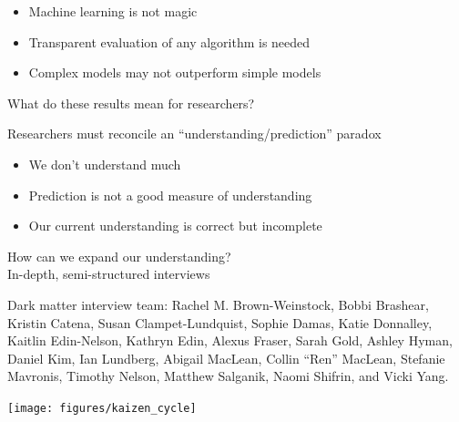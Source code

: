 \documentclass[aspectratio=169]{beamer}
\begin{document}
\begin{frame}

\begin{itemize}
\item Machine learning is not magic\pause
\item Transparent evaluation of any algorithm is needed \pause
\item Complex models may not outperform simple models
\end{itemize}

\end{frame}
\begin{frame}

\begin{center}
\Large{What do these results mean for researchers?}
\end{center}

\end{frame}
\begin{frame}

Researchers must reconcile an ``understanding/prediction'' paradox \pause
\begin{itemize}
\item We don't understand much \pause
\item Prediction is not a good measure of understanding \pause
\item Our current understanding is correct but incomplete
\end{itemize}

\end{frame}
\begin{frame}

\begin{center}
{\Large How can we expand our understanding?}\\ 
\vspace{0.5in}
\pause
{\Large In-depth, semi-structured interviews}
\end{center}

\vfill
Dark matter interview team: Rachel M. Brown-Weinstock, Bobbi Brashear, Kristin Catena, Susan Clampet-Lundquist, Sophie Damas, Katie Donnalley, Kaitlin Edin-Nelson, Kathryn Edin, Alexus Fraser, Sarah Gold, Ashley Hyman, Daniel Kim, Ian Lundberg, Abigail MacLean, Collin ``Ren'' MacLean, Stefanie Mavronis, Timothy Nelson, Matthew Salganik, Naomi Shifrin, and Vicki Yang.
\end{frame}
\begin{frame}

\begin{center}
\texttt{[image: figures/kaizen\_cycle]}
\end{center}

\end{frame}
\end{document}
